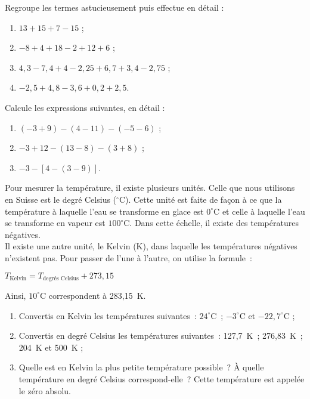 \begin{exercice}
Regroupe les termes astucieusement puis effectue en détail :
\begin{enumerate}
 \item $13 + 15 + 7 - 15$ ;
 \item $-8 + 4 + 18 - 2 + 12 + 6$ ;
 \item $4,3 - 7,4 + 4 - 2,25 + 6,7 + 3,4 - 2,75$ ;
 \item $-2,5 + 4,8 - 3,6 + 0,2 + 2,5$.
 \end{enumerate}
\end{exercice}


\begin{exercice}
Calcule les expressions suivantes, en détail :
\begin{enumerate}
 \item $(-3 + 9) - (4 - 11) - (-5 - 6)$ ;
 \item $-3 + 12 - (13 - 8) - (3 + 8)$ ;
 \item $-3 - [4 - (3 - 9)]$.
 \end{enumerate}
\end{exercice}


\begin{exercice}[Températures]
Pour mesurer la température, il existe plusieurs unités. Celle que nous utilisons en Suisse est le degré Celsius ($^{\circ}$C). Cette unité est faite de façon à ce que la température à laquelle l'eau se transforme en glace est $0^{\circ}$C et celle à laquelle l'eau se transforme en vapeur est $100^{\circ}$C. Dans cette échelle, il existe des températures négatives. \\[0.5em]
Il existe une autre unité, le Kelvin (K), dans laquelle les températures négatives n'existent pas. Pour passer de l'une à l'autre, on utilise la formule :
\begin{center} $T_\text{Kelvin} = T_\text{degrés Celsius} + 273,15$ \end{center}
Ainsi, $10^{\circ}$C correspondent à 283,15 K.
\begin{enumerate}
 \item Convertis en Kelvin les températures suivantes : $24^{\circ}$C ; $-3^{\circ}$C et $-22,7^{\circ}$C ;
 \item Convertis en degré Celsius les températures suivantes : 127,7 K ; 276,83 K ; 204 K et 500 K ;
 \item Quelle est en Kelvin la plus petite température possible ? À quelle température en degré Celsius correspond-elle ? Cette température est appelée le zéro absolu.
 \end{enumerate}
\end{exercice}